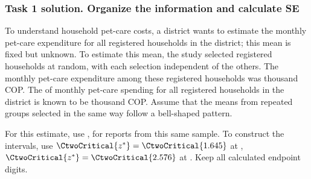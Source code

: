 \subsubsection*{Task 1 solution. Organize the information and calculate SE}
\label{sol:c2-2-a}
To understand household pet-care costs, a district wants to estimate the  monthly pet-care expenditure for all registered households in the district; this mean is fixed but unknown. To estimate this mean, the study selected  registered households at random, with each selection independent of the others. The  monthly pet-care expenditure among these  registered households was  thousand COP. The  of monthly pet-care spending for all registered households in the district is known to be  thousand COP. Assume that the means from repeated groups selected in the same way follow a bell-shaped pattern.

For this estimate, use ,   for reports from this same sample. To construct the intervals, use $\CtwoCritical{z^*}=\CtwoCritical{1.645}$ at , $\CtwoCritical{z^*}=\CtwoCritical{2.576}$ at . Keep all calculated endpoint digits.

